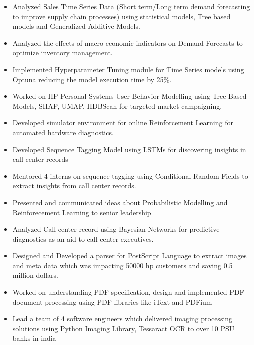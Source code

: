 \documentclass[10pt,a4paper,ragged2e,withhyper]{altacv}
\begin{document}
\begin{paracol}{1}
\par\divider
{}

\begin{itemize}
\item Analyzed Sales Time Series Data (Short term/Long term demand forecasting to
improve supply chain processes) using statistical models, Tree based models
and Generalized Additive Models.
\item Analyzed the effects of macro economic indicators on Demand Forecasts to
optimize inventory management.
\item Implemented Hyperparameter Tuning module for Time Series models using Optuna
reducing the model execution time by 25\%.
\item Worked on HP Personal Systems User Behavior Modelling using Tree Based Models,
SHAP, UMAP, HDBScan for targeted market campaigning.
\item Developed simulator environment for online Reinforcement Learning for
automated hardware diagnostics.
\item Developed Sequence Tagging Model using LSTMs for discovering insights in
call center records
\item Mentored 4 interns on sequence tagging using Conditional Random Fields to
extract insights from call center records.
\item Presented and communicated ideas about Probabilistic Modelling and
Reinforecement Learning to senior leadership
\item Analyzed Call center record using Bayesian Networks for predictive diagnostics
as an aid to call center executives.
\end{itemize}


\newpage
\par\divider
{}
\begin{itemize}
\item Designed and Developed a parser for PostScript Language to extract images and
meta data which was impacting 50000 hp customers and saving 0.5 million dollars.
\item Worked on understanding PDF specification, design and implemented PDF document
processing using PDF libraries like iText and PDFium
\item Lead a team of 4 software engineers which delivered imaging processing solutions using
Python Imaging Library, Tessaract OCR to over 10 PSU banks in india
\end{itemize}


\end{paracol}
\end{document}

